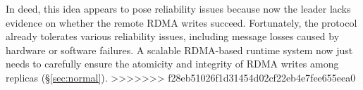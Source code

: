 In deed, this idea appears to pose reliability issues because now the leader
lacks evidence on whether the remote RDMA writes succeed. Fortunately, the
\paxos protocol already tolerates various reliability issues, including message
losses caused by hardware or software failures. A scalable RDMA-based \paxos
runtime system now just needs to carefully ensure the atomicity and integrity
of RDMA writes among replicas (\S\ref{sec:normal}).
>>>>>>> f28eb51026f1d31454d02cf22eb4e7fee655eea0






